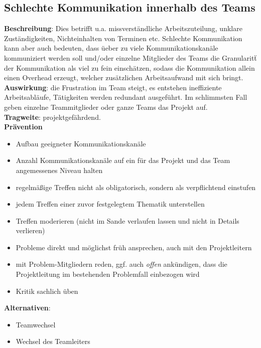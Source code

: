 \documentclass[a4paper, 12pt, titlepage]{scrartcl}
\begin{document}
	\subsection{Schlechte Kommunikation innerhalb des Teams}
		\textbf{Beschreibung}: Dies betrifft u.a. missverst\"andliche Arbeitszuteilung, unklare Zust\"andigkeiten, Nichteinhalten von Terminen etc. Schlechte Kommunikation kann aber auch bedeuten, dass \"ueber zu viele Kommunikationskan\"ale kommuniziert werden soll und/oder einzelne Mitglieder des Teams die Granularit\"t der Kommunikation als viel zu fein einsch\"atzen, sodass die Kommunikation allein einen Overhead erzeugt, welcher zus\"atzlichen Arbeitsaufwand mit sich bringt.\\
		\textbf{Auswirkung}: die Frustration im Team steigt, es entstehen ineffiziente Arbeitsabl\"aufe, T\"atigkeiten werden redundant ausgef\"uhrt. Im schlimmsten Fall geben einzelne Teammitglieder oder ganze Teams das Projekt auf.\\
		\textbf{Tragweite}: projektgef\"ahrdend.\\
		\textbf{Pr\"avention}
			\begin{itemize}
				\item Aufbau geeigneter Kommunikationskan\"ale
				\item Anzahl Kommunikationskan\"ale auf ein f\"ur das Projekt und das Team angemessenes Niveau halten
				\item regelm\"a\ss ige Treffen nicht als obligatorisch, sondern als verpflichtend einstufen
				\item jedem Treffen einer zuvor festgelegtem Thematik unterstellen
				\item Treffen moderieren (nicht im Sande verlaufen lassen und nicht in Details verlieren)
				\item Probleme direkt und m\"oglichst fr\"uh ansprechen, auch mit den Projektleitern
				\item mit Problem-Mitgliedern reden, ggf. auch \emph{offen} ank\"undigen, dass die Projektleitung im bestehenden Problemfall einbezogen wird
				\item Kritik sachlich \"uben
			\end{itemize}
		\textbf{Alternativen}: 
			\begin{itemize}
				\item Teamwechsel
				\item Wechsel des Teamleiters
			\end{itemize}
\end{document}
